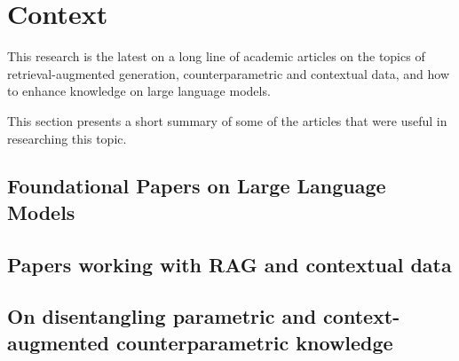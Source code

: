 \section{Context}

This research is the latest on a long line of academic articles on the topics of retrieval-augmented generation, counterparametric and contextual data, and how to enhance knowledge on large language models.

This section presents a short summary of some of the articles that were useful in researching this topic.


\subsection{Foundational Papers on Large Language Models}

\subsection{Papers working with RAG and contextual data}

\subsection{On disentangling parametric and context-augmented counterparametric knowledge}
